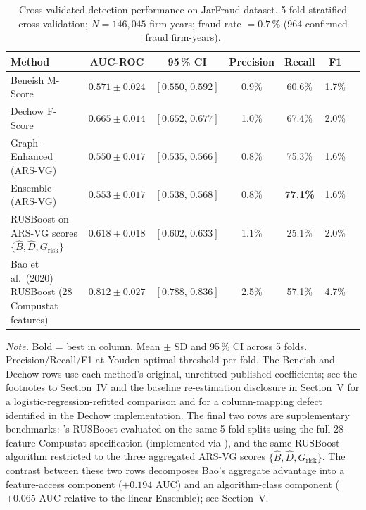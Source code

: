 \documentclass[12pt]{article}
\begin{document}
\begin{table}[tbp]
\centering
\caption{Cross-validated detection performance on JarFraud dataset.
         5-fold stratified cross-validation; $N = 146{,}045$ firm-years;
         fraud rate $= 0.7\,\%$ (964 confirmed fraud firm-years).}
\label{tab:results}
\small
\begin{tabular}{>{\raggedright\arraybackslash}p{4.5cm}cccccc}
\toprule
\textbf{Method} &
\textbf{AUC-ROC} &
\textbf{95\,\% CI} &
\textbf{Precision} &
\textbf{Recall} &
\textbf{F1} \\
\midrule
Beneish M-Score \citep{beneish1999}
  & $0.571 \pm 0.024$ & $[0.550,\,0.592]$ & 0.9\% & 60.6\% & 1.7\% \\
Dechow F-Score \citep{dechow2011}
  & $\mathbf{0.665} \pm 0.014$ & $[0.652,\,0.677]$ & 1.0\% & 67.4\% & 2.0\% \\
Graph-Enhanced (ARS-VG)
  & $0.550 \pm 0.017$ & $[0.535,\,0.566]$ & 0.8\% & 75.3\% & 1.6\% \\
Ensemble (ARS-VG)
  & $0.553 \pm 0.017$ & $[0.538,\,0.568]$ & 0.8\% & \textbf{77.1\%} & 1.6\% \\
\addlinespace
RUSBoost on ARS-VG scores $\{\hat{B}, \hat{D}, G_{\text{risk}}\}$
  & $0.618 \pm 0.018$ & $[0.602,\,0.633]$ & 1.1\% & 25.1\% & 2.0\% \\
Bao et al.\ (2020) RUSBoost (28 Compustat features)
  & $\mathbf{0.812} \pm 0.027$ & $[0.788,\,0.836]$ & 2.5\% & 57.1\% & 4.7\% \\
\bottomrule
\end{tabular}
\end{table}

\noindent\textit{Note.} Bold = best in column.
Mean $\pm$ SD and 95\,\% CI across 5 folds.
Precision/Recall/F1 at Youden-optimal threshold per fold.
The Beneish and Dechow rows use each method's original,
unrefitted published coefficients; see the footnotes to
Section~IV and the baseline re-estimation disclosure in
Section~V for a logistic-regression-refitted comparison and for
a column-mapping defect identified in the Dechow implementation.
The final two rows are supplementary benchmarks: \citet{bao2020}'s RUSBoost
evaluated on the same 5-fold splits using the full 28-feature Compustat
specification (implemented via \citet{lemaitre2017}), and the same
RUSBoost algorithm restricted to the three aggregated ARS-VG scores
$\{\hat{B}, \hat{D}, G_{\text{risk}}\}$.  The contrast between
these two rows decomposes Bao's aggregate advantage into a feature-access
component ($+0.194$ AUC) and an algorithm-class component ($+0.065$ AUC
relative to the linear Ensemble); see
Section~V.
\end{document}
